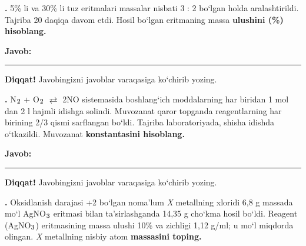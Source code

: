 \documentclass[11pt,a4paper]{article}
\renewcommand{\textsubscript}[1]{\ensuremath{_{\text{\fontsize{8}{8}\selectfont #1}}}}
\newcommand{\qn}[1]{\textbf{\fontsize{11.5}{13}\selectfont #1}}
\newcommand{\qsep}{\par\vspace{13pt}}
\newcommand{\javob}{\par\nopagebreak[4]\smallskip\noindent\textbf{Javob:} \rule[-2pt]{7.5cm}{0.4pt}\par\smallskip\noindent\textbf{Diqqat!} Javobingizni javoblar varaqasiga ko`chirib yozing.\par\medskip}
\begin{document}
\noindent\setlength{\fboxsep}{0pt}
\par\bigskip
\noindent\qn{36.} 5\% li va 30\% li tuz eritmalari massalar nisbati 3 : 2 bo`lgan holda aralashtirildi. Tajriba 20 daqiqa davom etdi. Hosil bo`lgan eritmaning massa \textbf{ulushini (\%) hisoblang.}
\javob\qsep
\noindent\qn{37.} N\textsubscript{2} + O\textsubscript{2} $\rightleftarrows$ 2NO sistemasida boshlang`ich moddalarning har biridan 1 mol dan 2 l hajmli idishga solindi. Muvozanat qaror topganda reagentlarning har birining 2/3 qismi sarflangan bo`ldi. Tajriba laboratoriyada, shisha idishda o`tkazildi. Muvozanat \textbf{konstantasini hisoblang.}
\javob\qsep
\noindent\qn{38.} Oksidlanish darajasi +2 bo`lgan noma'lum \textit{X} metallning xloridi 6,8 g massada mo`l AgNO\textsubscript{3} eritmasi bilan ta'sirlashganda 14,35 g cho`kma hosil bo`ldi. Reagent (AgNO\textsubscript{3}) eritmasining massa ulushi 10\% va zichligi 1,12 g/ml; u mo`l miqdorda olingan. \textit{X} metallning nisbiy atom \textbf{massasini toping.}
\end{document}
